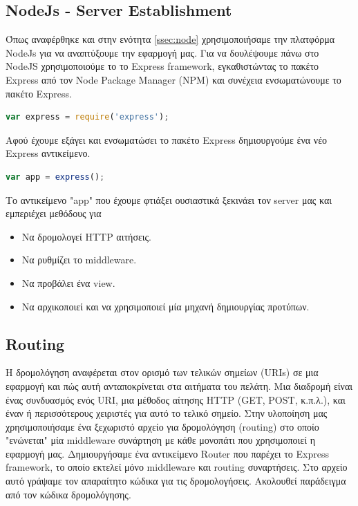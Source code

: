 	\subsection{NodeJs - Server Establishment}
	
	Όπως αναφέρθηκε και στην ενότητα \ref{ssec:node} χρησιμοποιήσαμε την πλατφόρμα NodeJs για να αναπτύξουμε την εφαρμογή μας. Για να δουλέψουμε πάνω στο NodeJS χρησιμοποιούμε το το Express framework, εγκαθιστώντας το πακέτο Express από τον Node Package Manager (NPM) και συνέχεια ενσωματώνουμε το πακέτο Express. 
	
		\begin{lstlisting}[language=Javascript]	
	  		var express = require('express');
		\end{lstlisting}
		
		
	Αφού έχουμε εξάγει και ενσωματώσει το πακέτο Express δημιουργούμε ένα νέο Express αντικείμενο.	
		
		
		\begin{lstlisting}[language=Javascript]	
			var app = express(); 	
 		\end{lstlisting}
		
			Το αντικείμενο "app" που έχουμε φτιάξει ουσιαστικά ξεκινάει τον server μας και εμπεριέχει μεθόδους για 
			\begin{itemize}
			\item Να δρομολογεί HTTP αιτήσεις.
			\item Να ρυθμίζει το middleware.
			\item Να προβάλει ένα view.
			\item Να αρχικοποιεί και να χρησιμοποιεί μία μηχανή δημιουργίας προτύπων.
			\end{itemize}
				
		\subsection{Routing}
	
		Η δρομολόγηση αναφέρεται στον ορισμό των τελικών σημείων (URIs) σε μια εφαρμογή και πώς αυτή ανταποκρίνεται στα αιτήματα του πελάτη. Μια διαδρομή είναι ένας συνδυασμός ενός URI, μια μέθοδος αίτησης HTTP (GET, POST, κ.π.λ.), και έναν ή περισσότερους χειριστές για αυτό το τελικό σημείο. 
		Στην υλοποίηση μας χρησιμοποιήσαμε ένα ξεχωριστό αρχείο για δρομολόγηση (routing) στο οποίο "ενώνεται" μία middleware συνάρτηση με κάθε μονοπάτι που χρησιμοποιεί η εφαρμογή μας. Δημιουργήσαμε ένα αντικείμενο Router που παρέχει το Express framework, το οποίο εκτελεί μόνο middleware και routing συναρτήσεις. Στο αρχείο αυτό γράψαμε τον απαραίτητο κώδικα για τις δρομολογήσεις. Ακολουθεί παράδειγμα από τον κώδικα δρομολόγησης.

